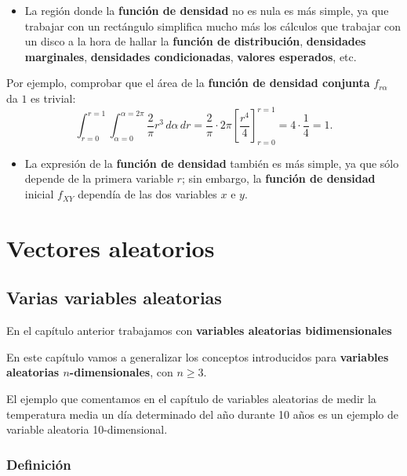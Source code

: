 \documentclass[
  letterpaper,
  DIV=11,
  numbers=noendperiod]{scrreprt}
\providecommand{\tightlist}{%
  \setlength{\itemsep}{0pt}\setlength{\parskip}{0pt}}\usepackage{longtable,booktabs,array}
\begin{document}
\begin{itemize}
\tightlist
\item
  La región donde la \textbf{función de densidad} no es nula es más
  simple, ya que trabajar con un rectángulo simplifica mucho más los
  cálculos que trabajar con un disco a la hora de hallar la
  \textbf{función de distribución}, \textbf{densidades marginales},
  \textbf{densidades condicionadas}, \textbf{valores esperados}, etc.
\end{itemize}

Por ejemplo, comprobar que el área de la \textbf{función de densidad
conjunta} \(f_{r\alpha}\) da \(1\) es trivial: \[
\int_{r=0}^{r=1}\int_{\alpha =0}^{\alpha =2\pi}\frac{2}{\pi} r^3\, d\alpha\, dr = \frac{2}{\pi}\cdot 2\pi \left[\frac{r^4}{4}\right]_{r=0}^{r=1}=4\cdot \frac{1}{4}=1.
\]

\begin{itemize}
\tightlist
\item
  La expresión de la \textbf{función de densidad} también es más simple,
  ya que sólo depende de la primera variable \(r\); sin embargo, la
  \textbf{función de densidad} inicial \(f_{XY}\) dependía de las dos
  variables \(x\) e \(y\).
\end{itemize}


\hypertarget{vectores-aleatorios}{%
\chapter{Vectores aleatorios}\label{vectores-aleatorios}}

\hypertarget{varias-variables-aleatorias}{%
\section{Varias variables
aleatorias}\label{varias-variables-aleatorias}}

En el capítulo anterior trabajamos con \textbf{variables aleatorias
bidimensionales}

En este capítulo vamos a generalizar los conceptos introducidos para
\textbf{variables aleatorias \(n\)-dimensionales}, con \(n\geq 3\).

El ejemplo que comentamos en el capítulo de variables aleatorias de
medir la temperatura media un día determinado del año durante 10 años es
un ejemplo de variable aleatoria 10-dimensional.

\hypertarget{definiciuxf3n-3}{%
\subsection{Definición}\label{definiciuxf3n-3}}
\end{document}
